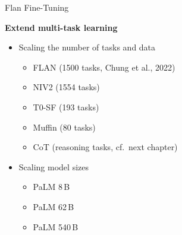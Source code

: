 \documentclass[11pt,compress,t,notes=noshow, xcolor=table]{beamer}
\begin{document}

\begin{frame}{Flan Fine-Tuning}

\vfill

\textbf{Extend multi-task learning} \vskip3mm

\begin{itemize}
\item Scaling the number of tasks and data
  \begin{itemize}
    \item FLAN (1500 tasks, Chung et al., 2022)
    \item NIV2 (1554 tasks)
    \item T0-SF (193 tasks)
    \item Muffin (80 tasks)
    \item CoT (reasoning tasks, cf.\ next chapter)
    \end{itemize}
\item Scaling model sizes
    \begin{itemize}
    \item PaLM 8\,B
    \item PaLM 62\,B
    \item PaLM 540\,B
    \end{itemize}
\end{itemize}

\vfill

\end{frame}

\end{document}
